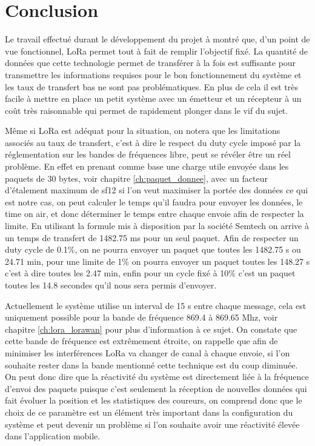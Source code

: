 
\chapter{Conclusion}

Le travail effectué durant le développement du projet à montré que, d'un point de vue fonctionnel, LoRa permet tout à fait de remplir l'objectif fixé. La quantité de données que cette technologie permet de transférer à la fois est suffisante pour transmettre les informations requises pour le bon fonctionnement du système et les taux de transfert bas ne sont pas problématiques. En plus de cela il est très facile à mettre en place un petit système avec un émetteur et un récepteur à un coût très raisonnable qui permet de rapidement plonger dans le vif du sujet.

Même si LoRa est adéquat pour la situation, on notera que les limitations associés au taux de transfert, c'est à dire le respect du duty cycle imposé par la réglementation sur les bandes de fréquences libre, peut se révéler être un réel problème. En effet en prenant comme base une charge utile envoyée dans les paquets de 30 bytes, voir chapitre \ref{ch:paquet_donnee}, avec un facteur d'étalement maximum de sf12 si l'on veut maximiser la portée des données ce qui est notre cas, on peut calculer le temps qu'il faudra pour envoyer les données, le time on air, et donc déterminer le temps entre chaque envoie afin de respecter la limite. En utilisant la formule mis à disposition par la société Semtech on arrive à un temps de transfert de 1482.75 ms pour un seul paquet. Afin de respecter un duty cycle de 0.1\%, on ne pourra envoyer un paquet que toutes les 1482.75 s ou 24.71 min, pour une limite de 1\% on pourra envoyer un paquet toutes les 148.27 s c'est à dire toutes les 2.47 min, enfin pour un cycle fixé à 10\% c'est un paquet toutes les 14.8 secondes qu'il nous sera permis d'envoyer. \cite{lora_design_guide}

Actuellement le système utilise un interval de 15 s entre chaque message, cela est uniquement possible pour la bande de fréquence 869.4 à 869.65 Mhz, voir chapitre  \ref{ch:lora_lorawan} pour plus d'information à ce sujet. On constate que cette bande de fréquence est extrêmement étroite, on rappelle que afin de minimiser les interférences LoRa va changer de canal à chaque envoie, si l'on souhaite rester dans la bande mentionné cette technique est du coup diminuée. On peut donc dire que la réactivité du système est directement liée à la fréquence d'envoi des paquets puisque c'est seulement la réception de nouvelles données qui fait évoluer la position et les statistiques des coureurs, on comprend donc que le choix de ce paramètre est un élément très important dans la configuration du système et peut devenir un problème si l'on souhaite avoir une réactivité élevée dans l'application mobile.

